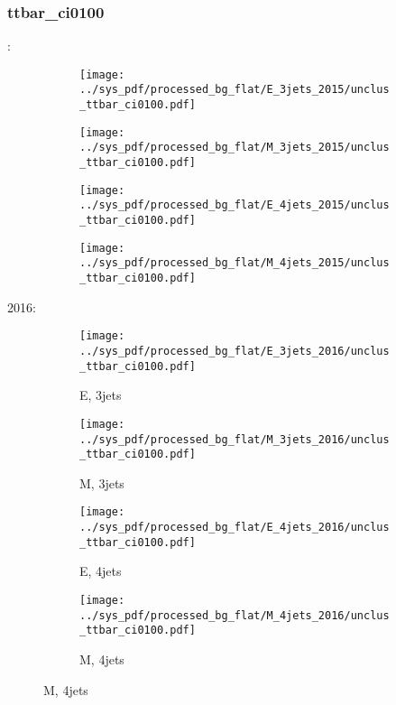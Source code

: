 \documentclass{beamer}
\begin{document}
\begin{frame}
\frametitle{ttbar_ci0100}
\fontsize{5}{1}:
\begin{figure}
\centering
\begin{subfigure}[b]{0.24\textwidth}
\texttt{[image: ../sys\_pdf/processed\_bg\_flat/E\_3jets\_2015/unclus\_ttbar\_ci0100.pdf]}
\end{subfigure}
\begin{subfigure}[b]{0.24\textwidth}
\texttt{[image: ../sys\_pdf/processed\_bg\_flat/M\_3jets\_2015/unclus\_ttbar\_ci0100.pdf]}
\end{subfigure}
\begin{subfigure}[b]{0.24\textwidth}
\texttt{[image: ../sys\_pdf/processed\_bg\_flat/E\_4jets\_2015/unclus\_ttbar\_ci0100.pdf]}
\end{subfigure}
\begin{subfigure}[b]{0.24\textwidth}
\texttt{[image: ../sys\_pdf/processed\_bg\_flat/M\_4jets\_2015/unclus\_ttbar\_ci0100.pdf]}
\end{subfigure}
\end{figure}
2016:
\begin{figure}
\centering
\begin{subfigure}[b]{0.24\textwidth}
\texttt{[image: ../sys\_pdf/processed\_bg\_flat/E\_3jets\_2016/unclus\_ttbar\_ci0100.pdf]}
\captionsetup{font=tiny}
\caption{E, 3jets}
\end{subfigure}
\begin{subfigure}[b]{0.24\textwidth}
\texttt{[image: ../sys\_pdf/processed\_bg\_flat/M\_3jets\_2016/unclus\_ttbar\_ci0100.pdf]}
\captionsetup{font=tiny}
\caption{M, 3jets}
\end{subfigure}
\begin{subfigure}[b]{0.24\textwidth}
\texttt{[image: ../sys\_pdf/processed\_bg\_flat/E\_4jets\_2016/unclus\_ttbar\_ci0100.pdf]}
\captionsetup{font=tiny}
\caption{E, 4jets}
\end{subfigure}
\begin{subfigure}[b]{0.24\textwidth}
\texttt{[image: ../sys\_pdf/processed\_bg\_flat/M\_4jets\_2016/unclus\_ttbar\_ci0100.pdf]}
\captionsetup{font=tiny}
\caption{M, 4jets}
\end{subfigure}
\end{figure}
\end{frame}
\end{document}
